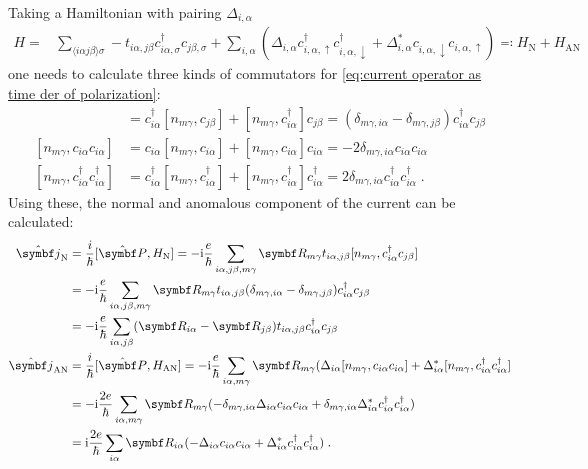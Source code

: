 \documentclass[../notes.tex]{subfiles}
\begin{document}
Taking a Hamiltonian with pairing \(\Delta_{i, \alpha}\)
\begin{align}
	H = &\sum_{\langle i \alpha j \beta \rangle \sigma} -t_{i \alpha, j \beta} c_{i \alpha, \sigma}^{\dagger} c_{j \beta, \sigma} + \sum_{i, \alpha} \left(\Delta_{i, \alpha} c_{i, \alpha, \uparrow}^{\dagger} c_{i, \alpha, \downarrow}^{\dagger} + \Delta_{i, \alpha}^{*} c_{i, \alpha, \downarrow} c_{i, \alpha, \uparrow}\right) \eqcolon H_{\mathrm{N}} + H_{\mathrm{AN}}
\end{align}
one needs to calculate three kinds of commutators for \cref{eq:current operator as time der of polarization}:
\begin{align}
	[n_{m \gamma}, c_{i \alpha}^{\dagger} c_{j \beta}] &= c_{i \alpha}^{\dagger} [n_{m \gamma}, c_{j \beta}] + [n_{m \gamma}, c_{i \alpha}^{\dagger}] c_{j \beta} = (\delta_{m\gamma, i\alpha} - \delta_{m\gamma, j\beta}) c_{i \alpha}^{\dagger} c_{j \beta} \\
	[n_{m \gamma}, c_{i \alpha} c_{i \alpha}] &= c_{i \alpha} [n_{m \gamma}, c_{i \alpha}] + [n_{m \gamma}, c_{i \alpha}] c_{i \alpha} = -2 \delta_{m\gamma, i\alpha} c_{i \alpha} c_{i \alpha} \\
	[n_{m \gamma}, c_{i \alpha}^{\dagger} c_{i \alpha}^{\dagger}] &= c_{i \alpha}^{\dagger} [n_{m \gamma}, c_{i \alpha}^{\dagger}] + [n_{m \gamma}, c_{i \alpha}^{\dagger}] c_{i \alpha}^{\dagger} = 2 \delta_{m\gamma, i\alpha} c_{i \alpha}^{\dagger} c_{i \alpha}^{\dagger} \;.
\end{align}
Using these, the normal and anomalous component of the current can be calculated:
\begin{align}
	\ope{\vb{j}}_{\mathrm{N}} &= \frac{i}{\hbar} [\ope{\vb{P}}, H_{\mathrm{N}}] = -\iu \frac{e}{\hbar} \sum_{i\alpha, j\beta, m\gamma} \vb{R}_{m \gamma} t_{i \alpha, j \beta} [n_{m \gamma}, c_{i \alpha}^{\dagger} c_{j \beta}] \nonumber \\
	&= -\iu \frac{e}{\hbar} \sum_{i\alpha, j\beta, m\gamma} \vb{R}_{m \gamma} t_{i \alpha, j \beta} (\delta_{m\gamma, i\alpha} - \delta_{m\gamma, j\beta}) c_{i \alpha}^{\dagger} c_{j \beta} \nonumber \\
	&= -\iu \frac{e}{\hbar} \sum_{i\alpha, j\beta} (\vb{R}_{i \alpha} - \vb{R}_{j \beta}) t_{i \alpha, j \beta} c_{i \alpha}^{\dagger} c_{j \beta} \\
	\ope{\vb{j}}_{\mathrm{AN}} &= \frac{i}{\hbar} [\ope{\vb{P}}, H_{\mathrm{AN}}] = -\iu \frac{e}{\hbar} \sum_{i\alpha, m\gamma} \vb{R}_{m \gamma} (\Delta_{i \alpha} [n_{m \gamma}, c_{i \alpha} c_{i \alpha}] + \Delta_{i \alpha}^* [n_{m \gamma}, c_{i \alpha}^{\dagger} c_{i \alpha}^{\dagger}] \nonumber \\
	&= -\iu \frac{2 e}{\hbar} \sum_{i\alpha, m\gamma} \vb{R}_{m \gamma} (-\delta_{m\gamma, i\alpha} \Delta_{i \alpha} c_{i \alpha} c_{i \alpha} + \delta_{m\gamma, i\alpha} \Delta_{i \alpha}^* c_{i \alpha}^{\dagger} c_{i \alpha}^{\dagger}) \nonumber \\
	&= \iu \frac{2 e}{\hbar} \sum_{i\alpha} \vb{R}_{i \alpha} (- \Delta_{i \alpha} c_{i \alpha} c_{i \alpha} + \Delta_{i \alpha}^* c_{i \alpha}^{\dagger} c_{i \alpha}^{\dagger}) \;.
\end{align}
\end{document}

